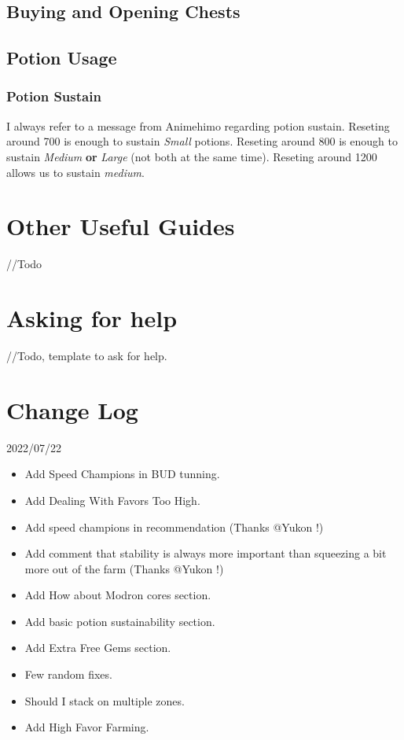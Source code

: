 \documentclass{article}
\begin{document}
\subsection{Buying and Opening Chests}
\subsection{Potion Usage}

\subsubsection{Potion Sustain}
\label{sec:potionSustain}

I always refer to a message from Animehimo regarding potion sustain.
Reseting around 700 is enough to sustain \textit{Small} potions.
Reseting around 800 is enough to sustain \textit{Medium} \textbf{or} \textit{Large} (not both at the same time).
Reseting around 1200 allows us to sustain \textit{medium}.


\section{Other Useful Guides}

//Todo


\section{Asking for help}
//Todo, template to ask for help.



\section{Change Log}

2022/07/22 
\begin{itemize}
    \item Add Speed Champions in BUD tunning.
    \item Add Dealing With Favors Too High.
    \item Add speed champions in recommendation (Thanks @Yukon !)
    \item Add comment that stability is always more important than squeezing a bit more out of the farm (Thanks @Yukon !)
    \item Add How about Modron cores section.
    \item Add basic potion sustainability section.
    \item Add Extra Free Gems section.
    \item Few random fixes.
    \item Should I stack on multiple zones.
    \item Add High Favor Farming.
\end{itemize}
\end{document}

